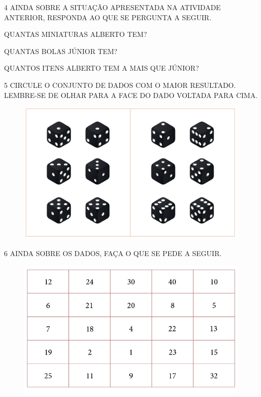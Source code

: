 \num{4} AINDA SOBRE A SITUAÇÃO APRESENTADA NA ATIVIDADE ANTERIOR, RESPONDA AO QUE SE PERGUNTA A SEGUIR.

\begin{escolha}
\item
  QUANTAS MINIATURAS ALBERTO TEM?\\

\item
  QUANTAS BOLAS JÚNIOR TEM?\\

\item
  QUANTOS ITENS ALBERTO TEM A MAIS QUE JÚNIOR?\\
\end{escolha}


\num{5} CIRCULE O CONJUNTO DE DADOS COM O MAIOR RESULTADO. LEMBRE-SE DE OLHAR PARA A FACE DO DADO VOLTADA PARA CIMA.


\begin{figure}[H]
\centering
\includegraphics[width=.65\textwidth]{./media/SAEB_1ANO_MAT_FIGURA6.png}
\end{figure}


\num{6} AINDA SOBRE OS DADOS, FAÇA O QUE SE PEDE A SEGUIR.

\begin{figure}[H]
\centering
\includegraphics[width=.7\textwidth]{./media/SAEB_1ANO_MAT_FIGURA7.png}
\end{figure}

